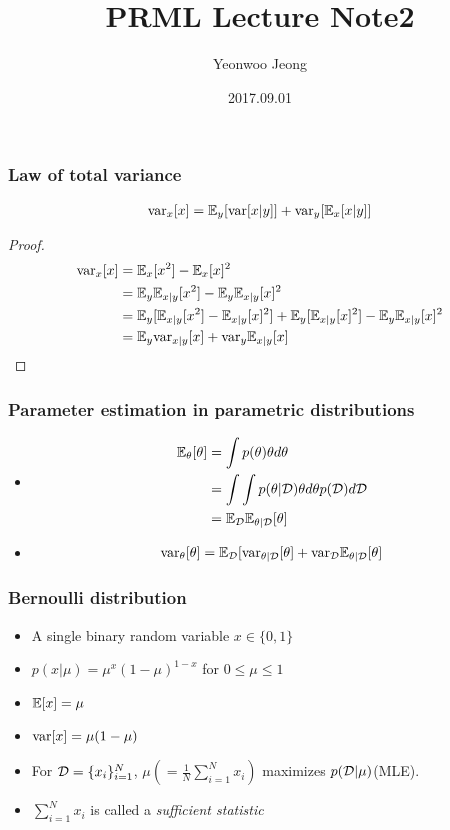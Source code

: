 \documentclass[10pt,mathserif]{beamer}
\title{PRML Lecture Note2}
\author{Yeonwoo Jeong}
\institute
    {Seoul National University}
\date{2017.09.01}
\begin{document}
\begin{frame}
  \titlepage
\end{frame}

\begin{frame}
\frametitle{Law of total variance}
\begin{align}
\mathrm{var}_x[x] = \mathbb{E}_y[\mathrm{var}[x| y]] + \mathrm{var}_y[\mathbb{E}_x[x| y]] \nonumber
\end{align}
\begin{proof}
\begin{align}
\mathrm{var}_x[x] &= \mathbb{E}_x[x^2] - \mathbb{E}_x[x]^2 \nonumber\\
&= \mathbb{E}_y\mathbb{E}_{x| y}[x^2] - \mathbb{E}_y \mathbb{E}_{x| y} [x]^2 \nonumber\\
&= \mathbb{E}_y[\mathbb{E}_{x| y}[x^2] - \mathbb{E}_{x| y} [x]^2]+\mathbb{E}_y[\mathbb{E}_{x| y}[x]^2] - \mathbb{E}_y \mathbb{E}_{x|y}[x]^2 \nonumber\\
&= \mathbb{E}_y \mathrm{var}_{x| y}[x] + \mathrm{var}_y\mathbb{E}_{x| y}[x] \nonumber
\end{align}
\end{proof}
\end{frame}
\begin{frame}
\frametitle{Parameter estimation in parametric distributions}
\begin{itemize}
\item
\begin{align}
\mathbb{E}_\theta[\theta] &= \int p(\theta) \theta d\theta \nonumber\\
                   &= \int \int p(\theta | \mathcal{D}) \theta d\theta p(\mathcal{D}) d\mathcal{D} \nonumber\\
                   &= \mathbb{E}_{\mathcal{D}}\mathbb{E}_{\theta | \mathcal{D}} [\theta] \nonumber
\end{align}
\item
\begin{align}
\mathrm{var}_\theta[\theta] = \mathbb{E}_{\mathcal{D}}[\mathrm{var}_{\theta| \mathcal{D}}[\theta] + \mathrm{var}_{\mathcal{D}}\mathbb{E}_{\theta|\mathcal{D}}[\theta]\nonumber
\end{align}
\end{itemize}
\end{frame}
\begin{frame}
\frametitle{Bernoulli distribution}
\begin{itemize}
\item A single binary random variable $x\in \{0, 1\}$
\item $p(x|\mu) = \mu^x(1-\mu)^{1-x}$ for $0\leq \mu \leq 1$
\item $\mathbb{E}[x] = \mu$
\item $\mathrm{var}[x] = \mu(1-\mu)$
\item For $\mathcal{D}=\{x_i\}_{i=1}^N$, $\mu(=\frac{1}{N}\sum_{i=1}^N x_i)$  maximizes $p(\mathcal{D}|\mu)$(MLE).
\item $\sum_{i=1}^N x_i$ is called a \textit{sufficient statistic}
\end{itemize}
\end{frame}
\end{document}
